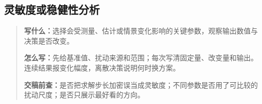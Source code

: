 \subsection{灵敏度或稳健性分析}
\begin{quote}\small
\noindent\textbf{\color{inkblue}写什么：}选择会受测量、估计或情景变化影响的关键参数，观察输出数值与决策是否改变。\par
\noindent\textbf{\color{inkblue}怎么写：}先给基准值、扰动来源和范围；每次写清固定量、改变量和输出。连续结果报变化幅度，离散决策说明何时换方案。\par
\noindent\textbf{\color{inkblue}交稿前查：}是否把求解步长加密误当成灵敏度；不同参数是否用了可比较的扰动尺度；是否只展示最好看的方向。
\end{quote}

